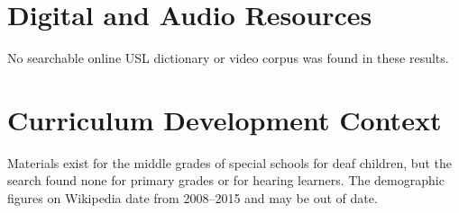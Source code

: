 \documentclass[12pt]{article}
\begin{document}
\section{Digital and Audio Resources}
No searchable online USL dictionary or video corpus was found in these results.
\section{Curriculum Development Context}
Materials exist for the middle grades of special schools for deaf children, but the search found none for primary grades or for hearing learners. The demographic figures on Wikipedia date from 2008--2015 and may be out of date.
\end{document}
